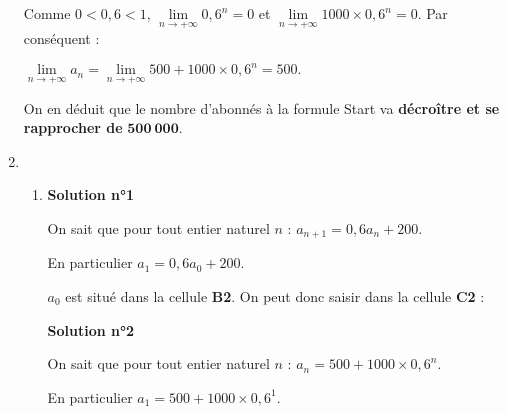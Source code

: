 \begin{corrige}
\begin{enumerate}
          \par
          \par
          Comme $0 < 0,6 < 1$, ${\lim\limits_{n \rightarrow +\infty}0,6^n=0}$ et ${\lim\limits_{n \rightarrow +\infty}1000 \times 0,6^n=0}$. Par conséquent :
          \par
          $\lim\limits_{n \rightarrow +\infty}a_n = \lim\limits_{n \rightarrow +\infty}500+1000 \times 0,6^n =500.$
          \par
          On en déduit que le nombre d'abonnés à la formule \og Start \fg{} va \textbf{décroître et se rapprocher de} $\bm{500~000}$.
          \item %
          \begin{enumerate}[label=\alph*.]
               \item %
               \textbf{Solution n°1}
               \par
               On sait que pour tout entier naturel $n$ : $a_{n+1}=0,6a_n+200$.
               \par
               En particulier $a_1=0,6a_0+200$.
               \par
               $a_0$ est situé dans la cellule \textbf{B2}. On peut donc saisir dans la cellule \textbf{C2} :
               \par
               \begin{center}
               \end{center}
               \par
               \textbf{Solution n°2}
               \par
               On sait que pour tout entier naturel $n$ : $a_{n}=500+1000 \times 0,6^n$.
               \par
               En particulier $a_1=500+1000 \times 0,6^1$.

\end{enumerate}
\end{enumerate}
\end{corrige}
